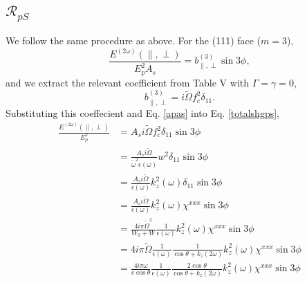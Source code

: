 \documentclass[10pt]{article}
\begin{document}
\subsection{\texorpdfstring{$\mathcal{R}_{pS}$}{RpS}}
We follow the same procedure as above. For the (111) face ($m = 3$),
\begin{equation}\label{totalshgps}%
\frac{E^{(2\omega)}(\parallel,\perp)}{E^{2}_{p}A_{s}} 
= b^{(3)}_{\parallel,\perp}\sin3\phi,
\end{equation}
and we extract the relevant coefficient from Table V with $\Gamma=\gamma=0$,
\begin{equation*}
b^{(3)}_{\parallel,\perp} = i\tilde{\Omega}f^{2}_{c}\delta_{11}.
\end{equation*}
Substituting this coeffecient and Eq. \eqref{apas} into Eq. \eqref{totalshgps},
\begin{equation*}
\begin{split}
\frac{E^{(2\omega)}(\parallel,\perp)}{E^{2}_{p}}
&= A_{s}i\tilde{\Omega}f^{2}_{c}\delta_{11}\sin3\phi\\
&= \frac{A_{s}i\tilde{\Omega}}{\tilde{\omega}^{2}\epsilon(\omega)}
    w^{2}\delta_{11}\sin3\phi\\
&= \frac{A_{s}i\tilde{\Omega}}{\epsilon(\omega)}
    k^{2}_{z}(\omega)\delta_{11}\sin3\phi\\
&= \frac{A_{s}i\tilde{\Omega}}{\epsilon(\omega)}
    k^{2}_{z}(\omega)\chi^{xxx}\sin3\phi\\
&= \frac{4i\pi\tilde{\Omega}^{2}}{W_{0} + W}
   \frac{1}{\epsilon(\omega)}k^{2}_{z}(\omega)\chi^{xxx}\sin3\phi\\
&= 4i\pi\tilde{\Omega}\frac{1}{\epsilon(\omega)}
   \frac{1}{\cos\theta + k_{z}(2\omega)}k^{2}_{z}(\omega)\chi^{xxx}\sin3\phi\\
&= \frac{4i\pi\omega}{c\cos\theta}
   \frac{1}{\epsilon(\omega)}
   \frac{2\cos\theta}{\cos\theta + k_{z}(2\omega)}
   k^{2}_{z}(\omega)\chi^{xxx}\sin3\phi
\end{split}
\end{equation*}
\end{document}
